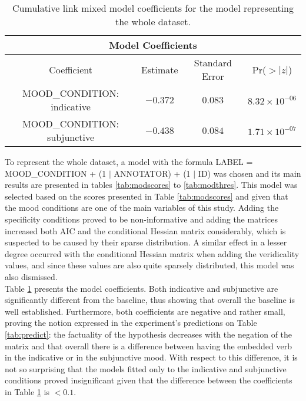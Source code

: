 \begin{table}
\center
  \begin{tabular}{|c|c|c|c|}
  \hline
  \multicolumn{4}{|c|}{Model Coefficients}\\\hline
  Coefficient & Estimate &Standard Error & Pr($>|z|$)\\\hline
MOOD\_CONDITION: indicative  & $-0.372$ &$0.083$ &$8.32\times 10^{-06}$\\\hline
MOOD\_CONDITION: subjunctive & $-0.438$ &$0.084$ &$1.71\times 10^{-07}$\\\hline 
  \end{tabular}
  \caption[Model Coefficients.]{Cumulative link mixed model coefficients for the model representing the whole dataset.}
  \label{tab:modcoeff} 
\end{table}

To represent the whole dataset, a model with the formula LABEL =  MOOD\_CONDITION + (1 $\mid$ ANNOTATOR) +  (1 $\mid$ ID) was chosen and its main results are presented in tables \ref{tab:modscores} to \ref{tab:modthres}. This model was selected based on the scores presented in Table \ref{tab:modscores} and given that the mood conditions are one of the main variables of this study. Adding the specificity conditions proved to be non-informative and adding the matrices increased both AIC and the conditional Hessian matrix considerably, which is suspected to be caused by their sparse distribution. A similar effect in a lesser degree occurred with the conditional Hessian matrix when adding the veridicality values, and since these values are also quite sparsely distributed, this model was also dismissed.\\  

Table \ref{tab:modcoeff} presents the model coefficients. Both indicative and subjunctive are significantly different from the baseline, thus showing that overall the baseline is well established. Furthermore, both coefficients are negative and rather small, proving the notion expressed in the experiment's predictions on Table \ref{tab:predict}: the factuality of the hypothesis decreases with the negation of the matrix and that overall there is a difference between having the embedded verb in the indicative or in the subjunctive mood. With respect to this difference, it is not so surprising that the models fitted only to the indicative and subjunctive conditions proved insignificant given that the difference between the coefficients in Table \ref{tab:modcoeff} is $<0.1$.\\

